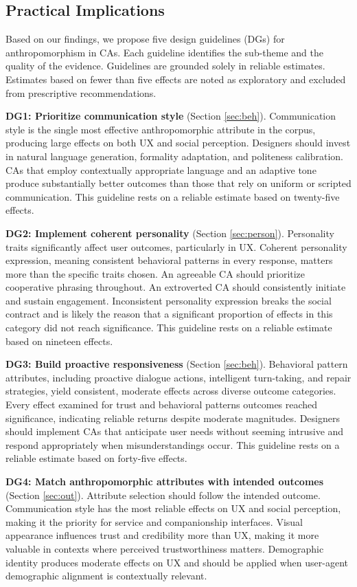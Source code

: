 \documentclass[preprint,review,12pt,authoryear,nonatbib]{elsarticle}
\begin{document}
\subsection{Practical Implications}

Based on our findings, we propose five design guidelines (DGs) for anthropomorphism in CAs. Each guideline identifies the sub-theme and the quality of the evidence. Guidelines are grounded solely in reliable estimates. Estimates based on fewer than five effects are noted as exploratory and excluded from prescriptive recommendations.

\textbf{DG1: Prioritize communication style} (Section \ref{sec:beh}). Communication style is the single most effective anthropomorphic attribute in the corpus, producing large effects on both UX and social perception. Designers should invest in natural language generation, formality adaptation, and politeness calibration. CAs that employ contextually appropriate language and an adaptive tone produce substantially better outcomes than those that rely on uniform or scripted communication. This guideline rests on a reliable estimate based on twenty-five effects.

\textbf{DG2: Implement coherent personality} (Section \ref{sec:person}). Personality traits significantly affect user outcomes, particularly in UX. Coherent personality expression, meaning consistent behavioral patterns in every response, matters more than the specific traits chosen. An agreeable CA should prioritize cooperative phrasing throughout. An extroverted CA should consistently initiate and sustain engagement. Inconsistent personality expression breaks the social contract and is likely the reason that a significant proportion of effects in this category did not reach significance. This guideline rests on a reliable estimate based on nineteen effects.

\textbf{DG3: Build proactive responsiveness} (Section \ref{sec:beh}). Behavioral pattern attributes, including proactive dialogue actions, intelligent turn-taking, and repair strategies, yield consistent, moderate effects across diverse outcome categories. Every effect examined for trust and behavioral patterns outcomes reached significance, indicating reliable returns despite moderate magnitudes. Designers should implement CAs that anticipate user needs without seeming intrusive and respond appropriately when misunderstandings occur. This guideline rests on a reliable estimate based on forty-five effects.

\textbf{DG4: Match anthropomorphic attributes with intended outcomes} (Section \ref{sec:out}). Attribute selection should follow the intended outcome. Communication style has the most reliable effects on UX and social perception, making it the priority for service and companionship interfaces. Visual appearance influences trust and credibility more than UX, making it more valuable in contexts where perceived trustworthiness matters. Demographic identity produces moderate effects on UX and should be applied when user-agent demographic alignment is contextually relevant. 
\end{document}
